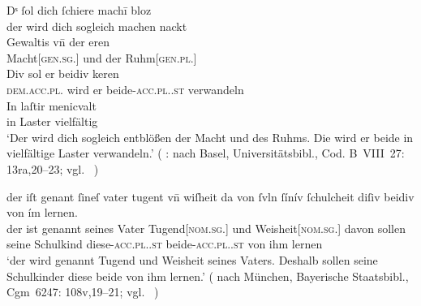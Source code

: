 \begin{exe}
\ex \label{ex:beid2p2combrem}
	\begin{xlist}
	\ex \label{ex:beid2p2combrem_1}
		\gll Dˢ ſol dich ſchiere machī bloz \\
			der wird dich sogleich machen nackt \\
	\sn \gll Gewaltis vn̄ der eren \\
			Macht[\textsc{gen.sg.\FemI}] und der Ruhm[\textsc{gen.pl.\FemI}] \\
	\sn \gll Div sol er beidiv keren \\
			\textsc{dem.acc.pl.\NeutI} wird er beide-\textsc{acc.pl.\NeutI.st}
			verwandeln \\
	\sn \gll In laſtir menicvalt \\
			in Laster vielfältig \\
		\trans `Der wird dich sogleich entblößen der Macht und des Ruhms.
			Die wird er beide in vielfältige Laster verwandeln.'
			(%
				: 
				nach Basel, Universitätsbibl., Cod. B~VIII~27: 13ra,20--23;
				vgl.~\cites[M317]{rem}%
			)


	\ex \label{ex:beid2p2combrem_3}
		\gll der iſt genant ſineſ vater tugent vn̄ wiſheit
			{da von} ſvln ſínív ſchulcheit\upshape\footnotemark{} diſiv
			beidiv von ím lernen. \\
			der ist genannt seines Vater Tugend[\textsc{nom.sg.\FemI}] und
			Weisheit[\textsc{nom.sg.\FemI}] davon sollen seine Schulkind
			diese-\textsc{acc.pl.\NeutI.st} beide-\textsc{acc.pl.\NeutI.st} von ihm
			lernen \\
		\trans `der wird genannt Tugend und Weisheit seines Vaters.
			Deshalb sollen seine Schulkinder diese beide von ihm lernen.'
			(%
				 nach
				München, Bayerische Staatsbibl., Cgm~6247: 108v,19--21;
				vgl.~\cite[M401]{rem}%
			)
	\end{xlist}
\end{exe}
